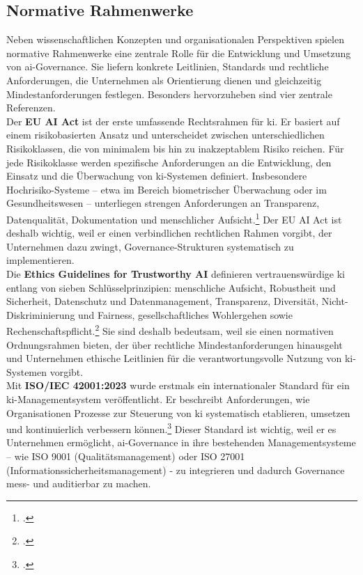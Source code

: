 \subsection{Normative Rahmenwerke}
\label{subsec:normative_rahmenwerke}
Neben wissenschaftlichen Konzepten und organisationalen Perspektiven spielen normative Rahmenwerke eine zentrale Rolle für die Entwicklung und Umsetzung von \ac{ai}-Governance.
Sie liefern konkrete Leitlinien, Standards und rechtliche Anforderungen, die Unternehmen als Orientierung dienen und gleichzeitig Mindestanforderungen festlegen.
Besonders hervorzuheben sind vier zentrale Referenzen.
\\
Der \textbf{EU AI Act} ist der erste umfassende Rechtsrahmen für \acf{ki}.
Er basiert auf einem risikobasierten Ansatz und unterscheidet zwischen unterschiedlichen Risikoklassen, die von minimalem bis hin zu inakzeptablem Risiko reichen.
Für jede Risikoklasse werden spezifische Anforderungen an die Entwicklung, den Einsatz und die Überwachung von \ac{ki}-Systemen definiert.
Insbesondere Hochrisiko-Systeme -- etwa im Bereich biometrischer Überwachung oder im Gesundheitswesen -- unterliegen strengen Anforderungen an Transparenz, Datenqualität, Dokumentation und menschlicher Aufsicht.\footcite[2]{kimAIGovernanceContext2025}
Der EU AI Act ist deshalb wichtig, weil er einen verbindlichen rechtlichen Rahmen vorgibt, der Unternehmen dazu zwingt, Governance-Strukturen systematisch zu implementieren.
\\
Die \textbf{Ethics Guidelines for Trustworthy AI} definieren \glqq{}vertrauenswürdige \ac{ki}\grqq{} entlang von sieben Schlüsselprinzipien: menschliche Aufsicht, Robustheit und Sicherheit, Datenschutz und Datenmanagement, Transparenz, Diversität, Nicht-Diskriminierung und Fairness, gesellschaftliches Wohlergehen sowie Rechenschaftspflicht.\footcite[14-18]{europeancomissionEthicsGuidelinesTrustworthy}
Sie sind deshalb bedeutsam, weil sie einen normativen Ordnungsrahmen bieten, der über rechtliche Mindestanforderungen hinausgeht und Unternehmen ethische Leitlinien für die verantwortungsvolle Nutzung von \ac{ki}-Systemen vorgibt.
\\
Mit \textbf{ISO/IEC 42001:2023} wurde erstmals ein internationaler Standard für ein \ac{ki}-Managementsystem veröffentlicht.
Er beschreibt Anforderungen, wie Organisationen Prozesse zur Steuerung von \ac{ki} systematisch etablieren, umsetzen und kontinuierlich verbessern können.\footcite[1]{isoISOIEC42001}
Dieser Standard ist wichtig, weil er es Unternehmen ermöglicht, \ac{ai}-Governance in ihre bestehenden Managementsysteme -- wie ISO 9001 (Qualitätsmanagement) oder ISO 27001 (Informationssicherheitsmanagement) - zu integrieren und dadurch Governance mess- und auditierbar zu machen.
